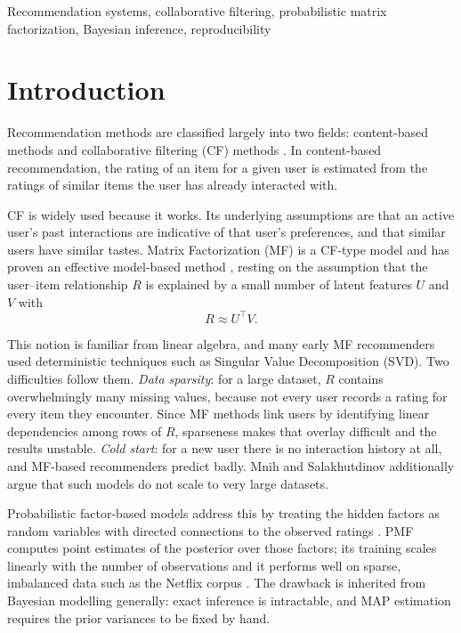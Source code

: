 \documentclass[conference]{IEEEtran}
\begin{document}
\begin{IEEEkeywords}
Recommendation systems, collaborative filtering, probabilistic matrix factorization,
Bayesian inference, reproducibility
\end{IEEEkeywords}

\section{Introduction}

Recommendation methods are classified largely into two fields: content-based methods and
collaborative filtering (CF) methods \cite{liu2013bayesian}. In content-based
recommendation, the rating of an item for a given user is estimated from the ratings of
similar items the user has already interacted with.

CF is widely used because it works. Its underlying assumptions are that an active user's
past interactions are indicative of that user's preferences, and that similar users have
similar tastes. Matrix Factorization (MF) is a CF-type model and has proven an effective
model-based method \cite{koren2009matrix}, resting on the assumption that the user--item
relationship $R$ is explained by a small number of latent features $U$ and $V$ with
\[R \approx U^\top V.\]

This notion is familiar from linear algebra, and many early MF recommenders used
deterministic techniques such as Singular Value Decomposition (SVD). Two difficulties
follow them. \emph{Data sparsity}: for a large dataset, $R$ contains overwhelmingly many
missing values, because not every user records a rating for every item they encounter.
Since MF methods link users by identifying linear dependencies among rows of $R$,
sparseness makes that overlay difficult and the results unstable. \emph{Cold start}: for a
new user there is no interaction history at all, and MF-based recommenders predict badly.
Mnih and Salakhutdinov \cite{mnih2007probabilistic} additionally argue that such models do
not scale to very large datasets.

Probabilistic factor-based models address this by treating the hidden factors as random
variables with directed connections to the observed ratings
\cite{mnih2007probabilistic}. PMF computes point estimates of the posterior over those
factors; its training scales linearly with the number of observations and it performs well
on sparse, imbalanced data such as the Netflix corpus \cite{bennett2007netflix}. The
drawback is inherited from Bayesian modelling generally: exact inference is intractable,
and MAP estimation requires the prior variances to be fixed by hand.
\end{document}

